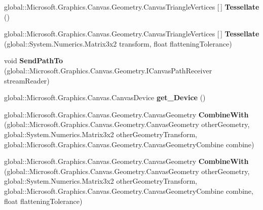 \begin{DoxyCompactItemize}
global\+::\+Microsoft.\+Graphics.\+Canvas.\+Geometry.\+Canvas\+Triangle\+Vertices \mbox{[}$\,$\mbox{]} {\bfseries Tessellate} ()
\item 
\mbox{\label{interface_microsoft_1_1_graphics_1_1_canvas_1_1_geometry_1_1_i_canvas_geometry_a2f5903941962961821c79b2142291f25}} 
global\+::\+Microsoft.\+Graphics.\+Canvas.\+Geometry.\+Canvas\+Triangle\+Vertices \mbox{[}$\,$\mbox{]} {\bfseries Tessellate} (global\+::\+System.\+Numerics.\+Matrix3x2 transform, float flattening\+Tolerance)
\item 
\mbox{\label{interface_microsoft_1_1_graphics_1_1_canvas_1_1_geometry_1_1_i_canvas_geometry_a085e2ad8f4fb755784ee6b62d52ca3c1}} 
void {\bfseries Send\+Path\+To} (global\+::\+Microsoft.\+Graphics.\+Canvas.\+Geometry.\+I\+Canvas\+Path\+Receiver stream\+Reader)
\item 
\mbox{\label{interface_microsoft_1_1_graphics_1_1_canvas_1_1_geometry_1_1_i_canvas_geometry_a53a8c779859965ce77af229c8b35d7dd}} 
global\+::\+Microsoft.\+Graphics.\+Canvas.\+Canvas\+Device {\bfseries get\+\_\+\+Device} ()
\item 
\mbox{\label{interface_microsoft_1_1_graphics_1_1_canvas_1_1_geometry_1_1_i_canvas_geometry_a6815c1deb8e9baa248c965b9a8f12fe7}} 
global\+::\+Microsoft.\+Graphics.\+Canvas.\+Geometry.\+Canvas\+Geometry {\bfseries Combine\+With} (global\+::\+Microsoft.\+Graphics.\+Canvas.\+Geometry.\+Canvas\+Geometry other\+Geometry, global\+::\+System.\+Numerics.\+Matrix3x2 other\+Geometry\+Transform, global\+::\+Microsoft.\+Graphics.\+Canvas.\+Geometry.\+Canvas\+Geometry\+Combine combine)
\item 
\mbox{\label{interface_microsoft_1_1_graphics_1_1_canvas_1_1_geometry_1_1_i_canvas_geometry_a9dbfa5fa955580afeef0c2a26e0281b9}} 
global\+::\+Microsoft.\+Graphics.\+Canvas.\+Geometry.\+Canvas\+Geometry {\bfseries Combine\+With} (global\+::\+Microsoft.\+Graphics.\+Canvas.\+Geometry.\+Canvas\+Geometry other\+Geometry, global\+::\+System.\+Numerics.\+Matrix3x2 other\+Geometry\+Transform, global\+::\+Microsoft.\+Graphics.\+Canvas.\+Geometry.\+Canvas\+Geometry\+Combine combine, float flattening\+Tolerance)

\end{DoxyCompactItemize}
